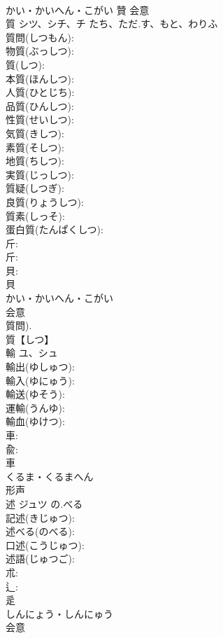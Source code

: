 \documentclass[8pt]{extreport}
\begin{document}
\begin{CJK}{UTF8}{min}
\\	かい・かいへん・こがい	贊	会意 
\\	質	シツ、シチ、チ	たち、ただ.す、もと、わりふ		
\\	質問(しつもん): 
\\	物質(ぶっしつ): 
\\	質(しつ): 
\\	本質(ほんしつ): 
\\	人質(ひとじち): 
\\	品質(ひんしつ): 
\\	性質(せいしつ): 
\\	気質(きしつ): 
\\	素質(そしつ): 
\\	地質(ちしつ): 
\\	実質(じっしつ): 
\\	質疑(しつぎ): 
\\	良質(りょうしつ): 
\\	質素(しっそ): 
\\	蛋白質(たんぱくしつ): 
\\	斤: 
\\	斤: 
\\	貝: 
\\	貝	
\\	かい・かいへん・こがい	
\\	会意 
\\	質問).	
\\	質【しつ】 
\\	輸	ユ、シュ			
\\	輸出(ゆしゅつ): 
\\	輸入(ゆにゅう): 
\\	輸送(ゆそう): 
\\	運輸(うんゆ): 
\\	輸血(ゆけつ): 
\\	車: 
\\	兪: 
\\	車	
\\	くるま・くるまへん	
\\	形声 
\\	述	ジュツ	の.べる		
\\	記述(きじゅつ): 
\\	述べる(のべる): 
\\	口述(こうじゅつ): 
\\	述語(じゅつご): 
\\	朮: 
\\	辶: 
\\	辵	
\\	しんにょう・しんにゅう	
\\	会意 

\end{CJK}
\end{document}
